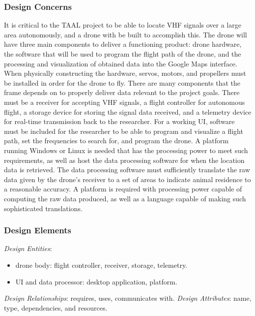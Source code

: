 \documentclass[onecolumn, draftclsnofoot,10pt, compsoc]{IEEEtran}
\begin{document}
\subsubsection{Design Concerns}

It is critical to the TAAL project to be able to locate VHF signals over a large area autonomously, and a drone with be built to accomplish this.
The drone will have three main components to deliver a functioning product: drone hardware, the software that will be used to program the flight path of the drone, and the processing and visualization of obtained data into the Google Maps interface.
\newline
\newline
When physically constructing the hardware, servos, motors, and propellers must be installed in order for the drone to fly. There are many components that the frame depends on to properly deliver data relevant to the project goals. 
\newline
\newline
There must be a receiver for accepting VHF signals, a flight controller for autonomous flight, a storage device for storing the signal data received, and a telemetry device for real-time transmission back to the researcher.
\newline
\newline
For a working UI, software must be included for the researcher to be able to program and visualize a flight path, set the frequencies to search for, and program the drone.
A platform running Windows or Linux is needed that has the processing power to meet such requirements, as well as host the data processing software for when the location data is retrieved.
\newline
\newline
The data processing software must sufficiently translate the raw data given by the drone's receiver to a set of areas to indicate animal residence to a reasonable accuracy.
A platform is required with processing power capable of computing the raw data produced, as well as a language capable of making such sophisticated translations.

\subsubsection{Design Elements}

\textit{Design Entities}: 
\begin{itemize}
    \item drone body: flight controller, receiver, storage, telemetry.
    \item UI and data processor: desktop application, platform.
\end{itemize}
\textit{Design Relationships}: requires, uses, communicates with.\newline
\textit{Design Attributes}: name, type, dependencies, and resources.
\end{document}
